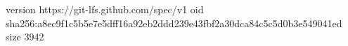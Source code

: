 version https://git-lfs.github.com/spec/v1
oid sha256:a8ec9f1c5b5e7e5dff16a92eb2ddd239e43fbf2a30dca84c5c5d0b3e549041ed
size 3942
